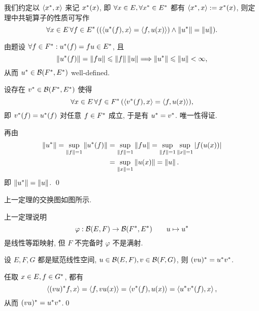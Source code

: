	我们约定以 $ \left\langle x^{*}, x \right\rangle $ 来记 $ x^{*}(x) $, 即 $ \forall x\in E, \forall x^{*}\in E^{*} $ 都有 $ \left\langle x^{*}, x \right\rangle:=x^{*}(x) $, 则定理中共轭算子的性质可写作
	\[
		\forall x\in E\,\forall f\in E^{*}\,((\left\langle u^{*}(f), x \right\rangle=\left\langle f, u(x) \right\rangle)\land\left\| u^{*} \right\|=\left\| u \right\|).
	\]
	\begin{Proof}
		由题设 $ \forall f\in F^{*}: u^{*}(f)=fu\in E^{*} $, 且
		\[
			\left\| u^{*}(f) \right\|=\left\| fu \right\|\leqslant\left\| f \right\|\left\| u \right\|\Longrightarrow\left\| u^{*} \right\|\leqslant\left\| u \right\|<\infty,
		\]
		从而 $ u^{*}\in\mathcal{B}(F^{*}, E^{*}) $ well-defined.

		设存在 $ v^{*}\in\mathcal{B}(F^{*}, E^{*}) $ 使得
		\[
			\forall x\in E\,\forall f\in F^{*}\,(\left\langle v^{*}(f), x \right\rangle=\left\langle f, u(x) \right\rangle),
		\]
		即 $ v^{*}(f)=u^{*}(f) $ 对任意 $ f\in F^{*} $ 成立, 于是有 $ u^{*}=v^{*} $. 唯一性得证.

		再由
		\[
			\begin{aligned}
				\left\| u^{*} \right\|=\sup_{\left\| f \right\|=1}\left\| u^{*}(f) \right\| & = \sup_{\left\| f \right\|=1}\left\| fu \right\|=\sup_{\left\| f \right\|=1}\sup_{\left\| x \right\|=1}\left| f(u(x)) \right| \\
				& = \sup_{\left\| x \right\|=1}\left\| u(x) \right\|=\left\| u \right\|.
			\end{aligned}
		\]
		即 $ \left\| u^{*} \right\|=\left\| u \right\| $. \qed
	\end{Proof}
	
	上一定理的交换图如图所示.
		\begin{center}
		\end{center}
	\begin{Remark}
		上一定理说明
		\[
			\varphi:\mathcal{B}(E, F)\to \mathcal{B}(F^{*}, E^{*})\qquad u\mapsto u^{*}
		\]
		是线性等距映射, 但 $ F $ 不完备时 $ \varphi $ 不是满射.
	\end{Remark}

	\begin{Proposition}
		设 $ E, F, G $ 都是赋范线性空间, $ u\in\mathcal{B}(E, F), v\in\mathcal{B}(F, G) $, 则 $ (vu)^{*}=u^{*}v^{*} $.
	\end{Proposition}
	\begin{Proof}
		任取 $ x\in E, f\in G^{*} $, 都有
		\[
			\left\langle (vu)^{*}f, x \right\rangle=\left\langle f, vu(x) \right\rangle=\left\langle v^{*}(f), u(x) \right\rangle=\left\langle u^{*}v^{*}(f), x \right\rangle,
		\]
		从而 $ (vu)^{*}=u^{*}v^{*} $.\qed
	\end{Proof}

